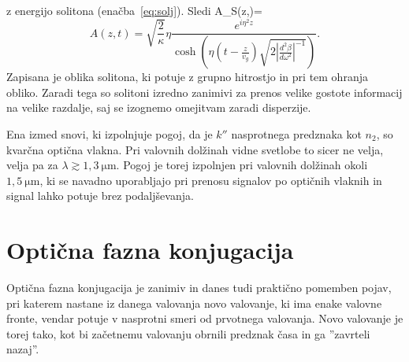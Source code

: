 z energijo solitona (enačba~\ref{eq:solj}). Sledi 
\beq
A_S\left(z,\tau\right)=\eta{}\,
\eeq
\begin{equation}
A\left(z,t\right)=\sqrt{\frac{2}{\kappa}}\eta\frac{e^{i\eta^{2}z}}{{\cosh}\left(\eta (t-\frac{z}{v_g}) 
\sqrt{2\left|\frac{d^{2}\beta}{d\omega^{2}}\right|^{-1}}\right)}.
\label{8.96}
\end{equation}
Zapisana je oblika solitona, ki potuje z grupno hitrostjo in pri tem ohranja obliko. Zaradi tega
so solitoni izredno zanimivi za prenos velike gostote informacij na velike razdalje, saj se izognemo
omejitvam zaradi disperzije. 

\begin{remark}
Ena izmed snovi, ki izpolnjuje pogoj, da je $k''$ nasprotnega predznaka kot $n_2$, so kvarčna 
optična vlakna. Pri valovnih dolžinah vidne svetlobe to sicer ne velja, velja pa za 
$\lambda \gtrsim 1,3~\si{\micro\metre}$.
Pogoj je torej izpolnjen pri valovnih dolžinah okoli $1,5~\si{\micro\metre}$, ki se navadno uporabljajo 
pri prenosu signalov po optičnih vlaknih in signal lahko potuje brez podaljševanja. 
\end{remark}

\section{Optična fazna konjugacija}
Optična fazna konjugacija je zanimiv in danes tudi praktično pomemben
pojav, pri katerem nastane iz danega valovanja novo valovanje, ki ima enake valovne
fronte, vendar potuje v nasprotni smeri od prvotnega valovanja. Novo valovanje je torej tako,
kot bi začetnemu valovanju obrnili predznak časa in ga ''zavrteli nazaj''. 

